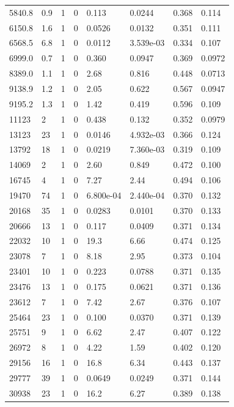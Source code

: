 \documentclass[preview]{standalone}
\begin{document}
{{{{{{{{{{\begin{tabular}{L{1.2cm}C{1.2cm} C{0.3cm}C{0.5cm} C{1.4cm}C{1.4cm} C{1.4cm}C{1.4cm}}
  5840.8  &   0.9  & 1     &  0 &  0.113  & 0.0244  & 0.368 &  0.114   \\ 
  6150.8  &   1.6  & 1     &  0 &  0.0526  & 0.0132  & 0.351 &  0.111   \\ 
  6568.5  &   6.8  & 1     &  0 &  0.0112  & 3.539e-03  & 0.334 &  0.107   \\ 
  6999.0  &   0.7  & 1     &  0 &  0.360  & 0.0947  & 0.369 &  0.0972   \\ 
  8389.0  &   1.1  & 1     &  0 &  2.68  & 0.816  & 0.448 &  0.0713   \\ 
  9138.9  &   1.2  & 1     &  0 &  2.05  & 0.622  & 0.567 &  0.0947   \\ 
  9195.2  &   1.3  & 1     &  0 &  1.42  & 0.419  & 0.596 &  0.109   \\ 
  11123  &     2  & 1     &  0 &  0.438  & 0.132  & 0.352 &  0.0979   \\ 
  13123  &    23  & 1     &  0 &  0.0146  & 4.932e-03  & 0.366 &  0.124   \\ 
  13792  &    18  & 1     &  0 &  0.0219  & 7.360e-03  & 0.319 &  0.109   \\ 
  14069  &     2  & 1     &  0 &  2.60  & 0.849  & 0.472 &  0.100   \\ 
  16745  &     4  & 1     &  0 &  7.27  & 2.44  & 0.494 &  0.106   \\ 
  19470  &    74  & 1     &  0 &  6.800e-04  & 2.440e-04  & 0.370 &  0.132   \\ 
  20168  &    35  & 1     &  0 &  0.0283  & 0.0101  & 0.370 &  0.133   \\ 
  20666  &    13  & 1     &  0 &  0.117  & 0.0409  & 0.371 &  0.134   \\ 
  22032  &    10  & 1     &  0 &  19.3  & 6.66  & 0.474 &  0.125   \\ 
  23078  &     7  & 1     &  0 &  8.18  & 2.95  & 0.373 &  0.104   \\ 
  23401  &    10  & 1     &  0 &  0.223  & 0.0788  & 0.371 &  0.135   \\ 
  23476  &    13  & 1     &  0 &  0.175  & 0.0621  & 0.371 &  0.136   \\ 
  23612  &     7  & 1     &  0 &  7.42  & 2.67  & 0.376 &  0.107   \\ 
  25464  &    23  & 1     &  0 &  0.100  & 0.0370  & 0.371 &  0.139   \\ 
  25751  &     9  & 1     &  0 &  6.62  & 2.47  & 0.407 &  0.122   \\ 
  26972  &     8  & 1     &  0 &  4.22  & 1.59  & 0.402 &  0.120   \\ 
  29156  &    16  & 1     &  0 &  16.8  & 6.34  & 0.443 &  0.137   \\ 
  29777  &    39  & 1     &  0 &  0.0649  & 0.0249  & 0.371 &  0.144   \\ 
  30938  &    23  & 1     &  0 &  16.2  & 6.27  & 0.389 &  0.138   \\ 
\hline 
\end{tabular} 

}}}}}}}}}}
\end{document}
